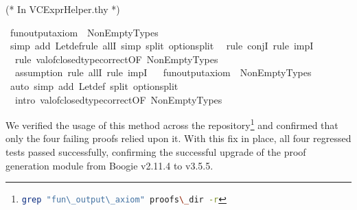 \begin{isabellebody}
\begin{isamarkuptext}%
(* In VCExprHelper.thy *)%
\end{isamarkuptext}\isamarkuptrue%
\isamarkupfalse%
\ fun{\isacharunderscore}{\kern0pt}output{\isacharunderscore}{\kern0pt}axiom{\isacharprime}{\kern0pt}\ \ NonEmptyTypes\ {\isacharequal}{\kern0pt}\isanewline
{\isacharparenleft}{\kern0pt}\ {\isacharparenleft}{\kern0pt}simp\ add{\isacharcolon}{\kern0pt}\ Let{\isacharunderscore}{\kern0pt}def{\isacharparenright}{\kern0pt}{\isacharcomma}{\kern0pt}{\isacharparenleft}{\kern0pt}rule\ allI{\isacharparenright}{\kern0pt}{\isacharplus}{\kern0pt}{\isacharcomma}{\kern0pt}\ {\isacharparenleft}{\kern0pt}simp\ split{\isacharcolon}{\kern0pt}\ option{\isachardot}{\kern0pt}split{\isacharparenright}{\kern0pt}{\isacharcomma}{\kern0pt}\isanewline
\ \ {\isacharparenleft}{\kern0pt}rule\ conjI{\isacharparenright}{\kern0pt}{\isacharcomma}{\kern0pt}\ {\isacharparenleft}{\kern0pt}rule\ impI{\isacharparenright}{\kern0pt}{\isacharcomma}{\kern0pt}\isanewline
\ \ {\isacharparenleft}{\kern0pt}rule\ val{\isacharunderscore}{\kern0pt}of{\isacharunderscore}{\kern0pt}closed{\isacharunderscore}{\kern0pt}type{\isacharunderscore}{\kern0pt}correct{\isacharbrackleft}{\kern0pt}OF\ NonEmptyTypes{\isacharbrackright}{\kern0pt}{\isacharparenright}{\kern0pt}{\isacharcomma}{\kern0pt}\isanewline
\ \ assumption{\isacharcomma}{\kern0pt}\ rule\ allI{\isacharcomma}{\kern0pt}\ rule\ impI{\isacharparenright}{\kern0pt}\isanewline
%
\ \isanewline
\isanewline
{}\isamarkupfalse%
\ fun{\isacharunderscore}{\kern0pt}output{\isacharunderscore}{\kern0pt}axiom\ \ NonEmptyTypes\ {\isacharequal}{\kern0pt}\isanewline
{\isacharparenleft}{\kern0pt}\ {\isacharparenleft}{\kern0pt}auto\ simp\ add{\isacharcolon}{\kern0pt}\ Let{\isacharunderscore}{\kern0pt}def\ split{\isacharcolon}{\kern0pt}\ option{\isachardot}{\kern0pt}split\isanewline
\ \ intro{\isacharcolon}{\kern0pt}\ val{\isacharunderscore}{\kern0pt}of{\isacharunderscore}{\kern0pt}closed{\isacharunderscore}{\kern0pt}type{\isacharunderscore}{\kern0pt}correct{\isacharbrackleft}{\kern0pt}OF\ NonEmptyTypes{\isacharbrackright}{\kern0pt}{\isacharparenright}{\kern0pt}\ {\isacharparenright}{\kern0pt}\isanewline
%
\ 
\end{isabellebody}

We verified the usage of this method across the repository\footnote{\lstinline[language=bash, columns=fixed]{grep "fun\_output\_axiom" proofs\_dir -r}}
and confirmed that only the four failing proofs relied upon it.
With this fix in place, all four regressed tests passed successfully,
confirming the successful upgrade of the proof generation module from Boogie v2.11.4 to v3.5.5.
